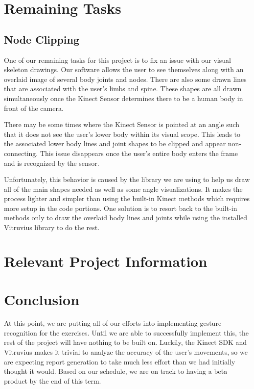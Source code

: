\documentclass[onecolumn, draftclsnofoot,10pt, compsoc]{IEEEtran}
\begin{document}
\section{Remaining Tasks}
\subsection{Node Clipping}
One of our remaining tasks for this project is to fix an issue with our visual skeleton drawings. Our software allows the user to see themselves along with an overlaid image of several body joints and nodes. There are also some drawn lines that are associated with the user's limbs and spine. These shapes are all drawn simultaneously once the Kinect Sensor determines there to be a human body in front of the camera. 

There may be some times where the Kinect Sensor is pointed at an angle such that it does not see the user's lower body within its visual scope. This leads to the associated lower body lines and joint shapes to be clipped and appear non-connecting. This issue disappears once the user's entire body enters the frame and is recognized by the sensor. 

Unfortunately, this behavior is caused by the library we are using to help us draw all of the main shapes needed as well as some angle visualizations. It makes the process lighter and simpler than using the built-in Kinect methods which requires more setup in the code portions. One solution is to resort back to the built-in methods only to draw the overlaid body lines and joints while using the installed Vitruvius library to do the rest.
\section{Relevant Project Information}


\section{Conclusion}
At this point, we are putting all of our efforts into implementing gesture recognition for the exercises. Until we are able to successfully implement this, the rest of the project will have nothing to be built on. Luckily, the Kinect SDK and Vitruvius makes it trivial to analyze the accuracy of the user's movements, so we are expecting report generation to take much less effort than we had initially thought it would. Based on our schedule, we are on track to having a beta product by the end of this term.

\newpage


\end{document}
